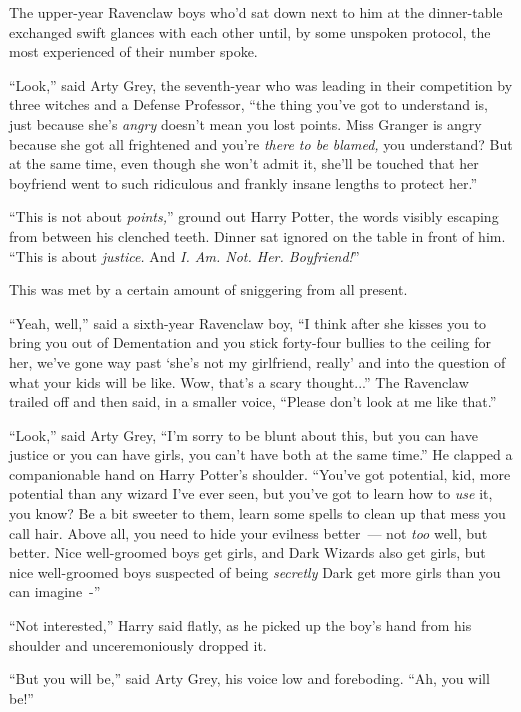 The upper-year Ravenclaw boys who'd sat down next to him at the dinner-table exchanged swift glances with each other until, by some unspoken protocol, the most experienced of their number spoke.

``Look,'' said Arty Grey, the seventh-year who was leading in their competition by three witches and a Defense Professor, ``the thing you've got to understand is, just because she's \emph{angry} doesn't mean you lost points. Miss Granger is angry because she got all frightened and you're \emph{there to be blamed,} you understand? But at the same time, even though she won't admit it, she'll be touched that her boyfriend went to such ridiculous and frankly insane lengths to protect her.''

``This is not about \emph{points,}'' ground out Harry Potter, the words visibly escaping from between his clenched teeth. Dinner sat ignored on the table in front of him. ``This is about \emph{justice.} And \emph{I. Am. Not. Her. Boyfriend!}''

This was met by a certain amount of sniggering from all present.

``Yeah, well,'' said a sixth-year Ravenclaw boy, ``I think after she kisses you to bring you out of Dementation and you stick forty-four bullies to the ceiling for her, we've gone way past `she's not my girlfriend, really' and into the question of what your kids will be like. Wow, that's a scary thought...'' The Ravenclaw trailed off and then said, in a smaller voice, ``Please don't look at me like that.''

``Look,'' said Arty Grey, ``I'm sorry to be blunt about this, but you can have justice or you can have girls, you can't have both at the same time.'' He clapped a companionable hand on Harry Potter's shoulder. ``You've got potential, kid, more potential than any wizard I've ever seen, but you've got to learn how to \emph{use} it, you know? Be a bit sweeter to them, learn some spells to clean up that mess you call hair. Above all, you need to hide your evilness better~--- not \emph{too} well, but better. Nice well-groomed boys get girls, and Dark Wizards also get girls, but nice well-groomed boys suspected of being \emph{secretly} Dark get more girls than you can imagine~-''

``Not interested,'' Harry said flatly, as he picked up the boy's hand from his shoulder and unceremoniously dropped it.

``But you will be,'' said Arty Grey, his voice low and foreboding. ``Ah, you will be!''

